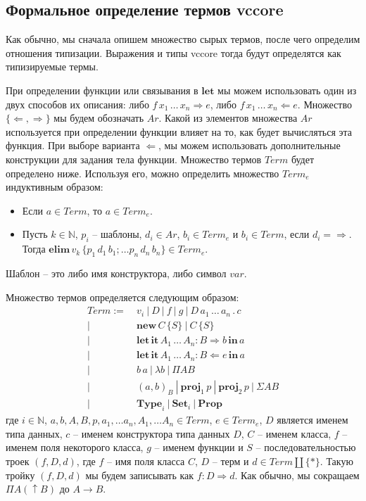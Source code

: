 \documentclass{amsart}
\theoremstyle{definition}
\theoremstyle{remark}
\newcommand{\red}{\Rightarrow}
\numberwithin{figure}{section}
\begin{document}
\subsection{Формальное определение термов vccore}

Как обычно, мы сначала опишем множество сырых термов, после чего определим отношения типизации.
Выражения и типы vccore тогда будут определятся как типизируемые термы.

При определении функции или связывания в $\mathbf{let}$ мы можем использовать один из двух способов их описания: либо $f\,x_1\,\ldots\,x_n \Rightarrow e$, либо $f\,x_1\,\ldots\,x_n \Leftarrow e$.
Множество $\{ \Leftarrow, \Rightarrow \}$ мы будем обозначать $Ar$.
Какой из элементов множества $Ar$ используется при определении функции влияет на то, как будет вычисляться эта функция.
При выборе варианта $\Leftarrow$, мы можем использовать дополнительные конструкции для задания тела функции.
Множество термов $Term$ будет определено ниже.
Используя его, можно определить множество $Term_e$ индуктивным образом:
\begin{itemize}
\item Если $a \in Term$, то $a \in Term_e$.
\item Пусть $k \in \mathbb{N}$, $p_i$ -- шаблоны, $d_i \in Ar$, $b_i \in Term_e$ и $b_i \in Term$, если $d_i = \Rightarrow$.
    Тогда $\mathbf{elim}\,v_k\,\{ p_1\,d_1\,b_1; \ldots p_n\,d_n\,b_n \} \in Term_e$.
\end{itemize}
Шаблон -- это либо имя конструктора, либо символ $var$.

Множество термов определяется следующим образом:
\begin{align*}
Term :=\ & v_i\ |\ D\ |\ f\ |\ g\ |\ D\,a_1\,\ldots\,a_n\,.\,c \\
      |\ & \mathbf{new}\,C\,\{ S \}\ |\ C\,\{ S \} \\
      |\ & \mathbf{let}\,\mathbf{it}\,A_1\,\ldots\,A_n : B \Rightarrow b\,\mathbf{in}\,a \\
      |\ & \mathbf{let}\,\mathbf{it}\,A_1\,\ldots\,A_n : B \Leftarrow e\,\mathbf{in}\,a \\
      |\ & b\,a\ |\ \lambda b\ |\ \Pi A B \\
      |\ & (a,b)_B\ |\ \mathbf{proj}_1\,p\ |\ \mathbf{proj}_2\,p\ |\ \Sigma A B \\
      |\ & \mathbf{Type}_i\ |\ \mathbf{Set}_i\ |\ \mathbf{Prop}
\end{align*}
где $i \in \mathbb{N}$, $a, b, A, B, p, a_1, \ldots a_n, A_1, \ldots A_n \in Term$, $e \in Term_e$, $D$ является именем типа данных, $c$ -- именем конструктора типа данных $D$, $C$ -- именем класса, $f$ -- именем поля некоторого класса, $g$ -- именем функции и $S$ -- последовательностью троек $(f,D,d)$, где $f$ -- имя поля класса $C$, $D$ -- терм и $d \in Term \amalg \{ * \}$.
Такую тройку $(f,D,d)$ мы будем записывать как $f : D \red d$.
Как обычно, мы сокращаем $\Pi A (\uparrow B)$ до $A \to B$.
\end{document}
